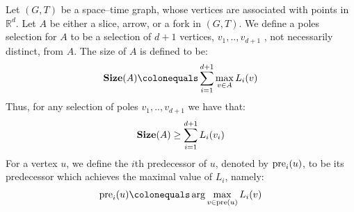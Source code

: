   \begin{definition}
    Let $(G,T)$ be a space--time graph, whose vertices are associated with points in $\mathbb{R}^{d}$. Let $A$ be either a slice, arrow, or a fork in $(G,T)$. We define a poles selection for $A$ to be a selection of $d+1$ vertices, $v_{1},..,v_{d+1}$ , not necessarily distinct, from $A$. The size of $A$ is defined to be:
    \begin{equation*}
      \begin{split}
        \Size{A} \colonequals  \sum_{i=1}^{d+1}  \max_{v\in A} L_{i}(v) 
      \end{split}
    \end{equation*} 
    Thus, for any selection of poles $v_{1},..,v_{d+1}$ we have that: 
    \begin{equation*}
      \begin{split}
        \mathbf{Size}(A) \ge \sum_{i=1}^{d+1} L_i(v_i) 
      \end{split}
    \end{equation*} 
    For a vertex $u$, we define the $i$th predecessor of $u$, denoted by $\text{pre}_{i}(u)$, to be its predecessor which achieves the maximal value of $L_{i}$,  namely:
    \begin{equation*}
      \begin{split}
        \prei{u} \colonequals  \arg \max_{v\in \pre{u}} L_{i}(v) 
      \end{split}
    \end{equation*}
  \end{definition}
    
